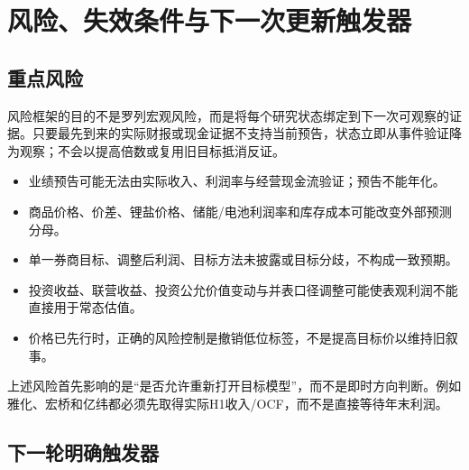 \chapter{风险、失效条件与下一次更新触发器}

\section{重点风险}

风险框架的目的不是罗列宏观风险，而是将每个研究状态绑定到下一次可观察的证据。只要最先到来的实际财报或现金证据不支持当前预告，状态立即从事件验证降为观察；不会以提高倍数或复用旧目标抵消反证。

\begin{riskbox}[高影响风险]
\begin{itemize}
  \item 业绩预告可能无法由实际收入、利润率与经营现金流验证；预告不能年化。
  \item 商品价格、价差、锂盐价格、储能/电池利润率和库存成本可能改变外部预测分母。
  \item 单一券商目标、调整后利润、目标方法未披露或目标分歧，不构成一致预期。
  \item 投资收益、联营收益、投资公允价值变动与并表口径调整可能使表观利润不能直接用于常态估值。
  \item 价格已先行时，正确的风险控制是撤销低位标签，不是提高目标价以维持旧叙事。
\end{itemize}
\end{riskbox}

上述风险首先影响的是“是否允许重新打开目标模型”，而不是即时方向判断。例如雅化、宏桥和亿纬都必须先取得实际H1收入/OCF，而不是直接等待年末利润。

\section{下一轮明确触发器}

